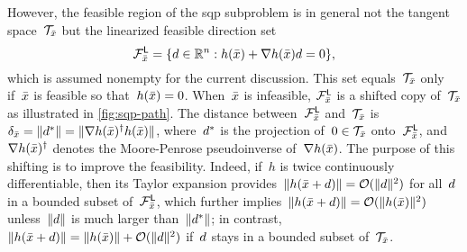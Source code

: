 However, the feasible region of the \gls{sqp} subproblem is in general not the tangent
space~$\mathcal{T}_{\bar{\iter}}$ but the linearized feasible direction set
\begin{equation*}
    \mathcal{F}_{\bar{\iter}}^{\mathsf{L}} = \set{\step \in \R^n : h(\bar{\iter}) +\nabla h(\bar{\iter}) \step  = 0},
\end{equation*}
which is assumed nonempty for the current discussion.
This set equals~$\mathcal{T}_{\bar{\iter}}$ only if~$\bar{\iter}$ is feasible so that~$h(\bar{\iter}) = 0$.
When~$\bar{\iter}$ is infeasible, $\mathcal{F}_{\bar{\iter}}^{\mathsf{L}}$ is a shifted copy of~$\mathcal{T}_{\bar{\iter}}$ as illustrated in \cref{fig:sqp-path}.
The distance between~$\mathcal{F}_{\bar{\iter}}^{\mathsf{L}}$ and~$\mathcal{T}_{\bar{\iter}}$ is~$\delta_{\bar{\iter}} = \norm{\step[\ast]} = \norm{\nabla h(\bar{\iter})^{\dagger} h(\bar{\iter})}$, where~$\step[\ast]$ is the projection of~$0 \in \mathcal{T}_{\bar{\iter}}$ onto~$\mathcal{F}_{\bar{\iter}}^{\mathsf{L}}$, and~$\nabla h(\bar{\iter})^{\dagger}$ denotes the Moore-Penrose pseudoinverse of~$\nabla h(\bar{\iter})$.
The purpose of this shifting is to improve the feasibility.
Indeed, if~$h$ is twice continuously differentiable, then its Taylor expansion provides~$\norm{h(\bar{\iter} + \step)} = \bigo(\norm{\step}^2)$ for all~$\step$ in a bounded subset of~$\mathcal{F}_{\bar{\iter}}^{\mathsf{L}}$, which further implies~$\norm{h(\bar{\iter} + \step)} = \bigo(\norm{h(\bar{\iter})}^2)$ unless~$\norm{\step}$ is much larger than~$\norm{\step[\ast]}$; in contrast,~$\norm{h(\bar{\iter} + \step)} = \norm{h(\bar{\iter})} + \bigo(\norm{\step}^2)$ if~$\step$ stays in a bounded subset of~$\mathcal{T}_{\bar{\iter}}$.

